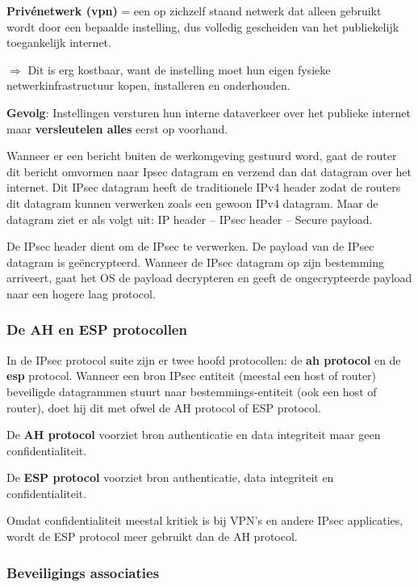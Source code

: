 
\textbf{Privénetwerk (\acrshort{vpn})} = een op zichzelf staand netwerk dat alleen gebruikt wordt door een bepaalde instelling, dus volledig gescheiden van het publiekelijk toegankelijk internet.

\noindent $\Rightarrow$ Dit is erg kostbaar, want de instelling moet hun eigen fysieke netwerkinfrastructuur kopen, installeren en onderhouden.

\noindent \textbf{Gevolg}: Instellingen versturen hun interne dataverkeer over het publieke internet maar \textbf{versleutelen alles} eerst op voorhand.

\noindent Wanneer er een bericht buiten de werkomgeving gestuurd word, gaat de router dit bericht omvormen naar Ipsec datagram en verzend dan dat datagram over het internet. Dit IPsec datagram heeft de traditionele IPv4 header zodat de routers dit datagram kunnen verwerken zoals een gewoon IPv4 datagram. Maar de datagram ziet er als volgt uit: IP header – IPsec header – Secure payload.

\noindent De IPsec header dient om de IPsec te verwerken. De payload van de IPsec datagram is geëncrypteerd. Wanneer de IPsec datagram op zijn bestemming arriveert, gaat het OS de payload decrypteren en geeft de ongecrypteerde payload naar een hogere laag protocol.

\subsubsection{De AH en ESP protocollen}

In de IPsec protocol suite zijn er twee hoofd protocollen: de \textbf{\acrfull{ah} protocol} en de \textbf{\acrfull{esp}} protocol. Wanneer een bron IPsec entiteit (meestal een host of router) beveiligde datagrammen stuurt naar bestemmings-entiteit (ook een host of router), doet hij dit met ofwel de AH protocol of ESP protocol.

\noindent De \textbf{AH protocol} voorziet bron authenticatie en data integriteit maar geen confidentialiteit.

\noindent De \textbf{ESP protocol} voorziet bron authenticatie, data integriteit en confidentialiteit.

\noindent Omdat confidentialiteit meestal kritiek is bij VPN's en andere IPsec applicaties, wordt de ESP protocol meer gebruikt dan de AH protocol.

\subsubsection{Beveiligings associaties}

